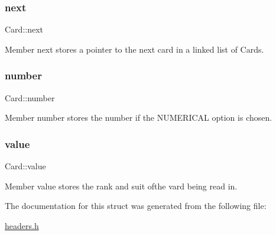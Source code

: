 \subsubsection{\texorpdfstring{next}{next}}
{\footnotesize\ttfamily Card\+::next}



Member \textquotesingle{}next\textquotesingle{} stores a pointer to the next card in a linked list of Cards. 

\mbox{\label{structCard_a8f209bb3a4387d6904a5f2187b5f1c65}} 
\subsubsection{\texorpdfstring{number}{number}}
{\footnotesize\ttfamily Card\+::number}



Member \textquotesingle{}number\textquotesingle{} stores the number if the N\+U\+M\+E\+R\+I\+C\+AL option is chosen. 

\mbox{\label{structCard_a2d649d6bb946578a3677f8919a887dec}} 
\subsubsection{\texorpdfstring{value}{value}}
{\footnotesize\ttfamily Card\+::value}



Member value stores the rank and suit ofthe vard being read in. 



The documentation for this struct was generated from the following file\+:\begin{DoxyCompactItemize}
\item 
\mbox{\hyperlink{headers_8h}{headers.\+h}}\end{DoxyCompactItemize}
